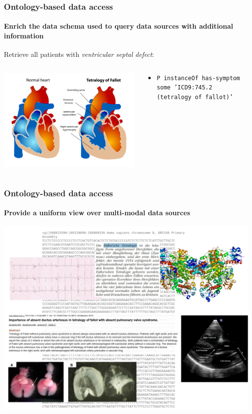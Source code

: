 \documentclass{beamer}
\renewcommand{\em}{\itshape}
\begin{document}
\begin{frame}
  \frametitle{Ontology-based data access} 
  \framesubtitle{Enrich the data schema used to query data sources
    with additional information}
  Retrieve all patients with {\em ventricular septal defect}:
  \vspace{1cm}
  \begin{columns}[onlytextwidth]
    \begin{column}{.5\textwidth}
      \centerline{\includegraphics[width=1\textwidth]{tetralogy.png}}
    \end{column}
    \begin{column}{.5\textwidth}
      {\tiny
      \begin{itemize}
      \item {\tt P instanceOf has-symptom some 'ICD9:745.2 (tetralogy of fallot)'}
      \end{itemize}
    }
    \end{column}
  \end{columns}
\end{frame}

\begin{frame}
  \frametitle{Ontology-based data access}
  \framesubtitle{Provide a uniform view over multi-modal data sources}
  \centerline{\includegraphics[width=1\textwidth]{fallot-slide.pdf}}
\end{frame}
\end{document}

